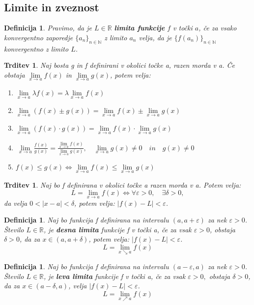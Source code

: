 \documentclass[11pt]{article}
\newtheorem{Trditev}[Izrek]{{\sc Trditev}}
\newtheorem{Definicija}[Izrek]{{\sc Definicija}}
\begin{document}
\subsection{Limite in zveznost}
\begin{Definicija}
	Pravimo, da je $L\in\mathbb{R}$ \textbf{limita funkcije} $f$ v točki $a$, če za vsako konvergentno zaporedje $\{a_n\}_{n\in \mathbb{N}}$ z limito $a_n$ velja, da je $\{f(a_n)\}_{n\in \mathbb{N}}$ konvergentno z limito $L$.
\end{Definicija}
\begin{Trditev}
	Naj bosta g in f definirani v okolici točke a, razen morda v a. Če obstaja $ \lim\limits_{x\to a}{f(x)}$ in $ \lim\limits_{x\to a}{g(x)}$, potem velja:
	\begin{enumerate}
		\item
		$\lim\limits_{x \to a}{ \lambda f(x)} = \lambda  \lim\limits_{x\to a}{f(x)}$
		\item
		$\lim\limits_{x \to a}{(f(x) \pm g(x))} =  \lim\limits_{x\to a}{f(x)} \pm \lim\limits_{x\to a}{g(x)}$
		\item
		$ \lim\limits_{x\to a}{(f(x)\cdot g(x) )} =  \lim\limits_{x\to a}{f(x)} \cdot  \lim\limits_{x\to a}{g(x)}$
		\item
		$\ \lim\limits_{x\to a}{\frac{f(x)}{g(x)}} = \frac{ \lim\limits_{x\to a}{f(x)}}{ \lim\limits_{x\to a}{g(x)}}, \quad  \lim\limits_{x\to a}{g(x)} \ne 0\quad  in \quad  g(x) \ne 0$
		\item
		$f(x) \le g(x) \iff  \lim\limits_{x\to a}{f(x)} \le  \lim\limits_{x\to a}{g(x)}$
	\end{enumerate}
\end{Trditev}
\begin{Trditev}
	Naj bo f definirana v okolici točke a razen morda v a. Potem velja:
	$$L =  \lim\limits_{x\to a}{f(x)} \iff \forall \varepsilon > 0, \quad \exists \delta > 0,$$ da velja $ 0 < |x - a| < \delta$, potem velja: $|f(x) - L | < \varepsilon$.
\end{Trditev}
\begin{Definicija}
	Naj bo funkcija f definirana na intervalu $(a, a + \varepsilon)$ za nek $\varepsilon > 0$. Število $L\in \mathbb{R}$, je \textbf{desna limita} funkcije f v točki a, če za vsak $\varepsilon > 0$, obstaja $\delta >0$, da za $x \in (a, a+\delta)$, potem velja: $|f(x) - L| < \varepsilon$.
	$$L = \lim\limits_{x \searrow a}{f(x)}$$
\end{Definicija}
\begin{Definicija}
	Naj bo funkcija f definirana na intervalu $(a-\varepsilon, a)$ za nek $\varepsilon > 0$. Število $L\in\mathbb{R}$, je \textbf{leva limita} funkcije f v točki a, če za vsak $\varepsilon > 0,$ obstaja $ \delta > 0$, da za $x\in(a- \delta, a)$, velja $|f(x) - L | < \varepsilon$.
	$$L = \lim\limits_{x \nearrow a}{f(x)}$$
\end{Definicija}
\end{document}
